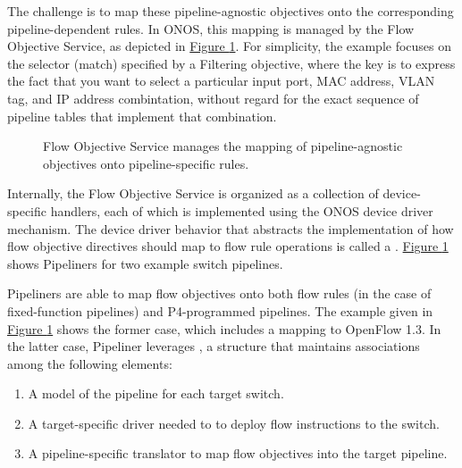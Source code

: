 \documentclass[letterpaper,11pt,english]{sphinxmanual}
\let\sphinxpxdimen\pdfpxdimen\else\newdimen\sphinxpxdimen
\begin{document}
The challenge is to map these pipeline-agnostic objectives onto the
corresponding pipeline-dependent rules. In ONOS, this mapping is
managed by the Flow Objective Service, as depicted in \hyperref[\detokenize{onos:fig-flowobj}]{Figure
\ref{\detokenize{onos:fig-flowobj}}}. For simplicity, the example focuses on the selector
(match) specified by a Filtering objective, where the key is to
express the fact that you want to select a particular input port, MAC
address, VLAN tag, and IP address combintation, without regard for
the exact sequence of pipeline tables that implement that combination.

\begin{figure}[htbp]
\centering
\capstart

\noindent\sphinxincludegraphics[width=500\sphinxpxdimen]{{Slide39}.png}
\caption{Flow Objective Service manages the mapping of pipeline-agnostic
objectives onto pipeline-specific rules.}\label{\detokenize{onos:id11}}\label{\detokenize{onos:fig-flowobj}}\end{figure}

Internally, the Flow Objective Service is organized as a collection of
device-specific handlers, each of which is implemented using the ONOS
device driver mechanism. The device driver behavior that abstracts the
implementation of how flow objective directives should map to flow
rule operations is called a .  \hyperref[\detokenize{onos:fig-flowobj}]{Figure \ref{\detokenize{onos:fig-flowobj}}} shows Pipeliners for two example switch pipelines.

Pipeliners are able to map flow objectives onto both flow rules (in
the case of fixed-function pipelines) and P4-programmed pipelines. The
example given in \hyperref[\detokenize{onos:fig-flowobj}]{Figure \ref{\detokenize{onos:fig-flowobj}}} shows the former
case, which includes a mapping to OpenFlow 1.3. In the latter case,
Pipeliner leverages , a structure that maintains
associations among the following elements:
\begin{enumerate}
\def\theenumi{\arabic{enumi}}
\def\labelenumi{\theenumi .}
\makeatletter\def\p@enumii{\p@enumi \theenumi .}\makeatother
\item {} 
A model of the pipeline for each target switch.

\item {} 
A target-specific driver needed to to deploy flow instructions to the switch.

\item {} 
A pipeline-specific translator to map flow objectives into the target pipeline.

\end{enumerate}
\end{document}
